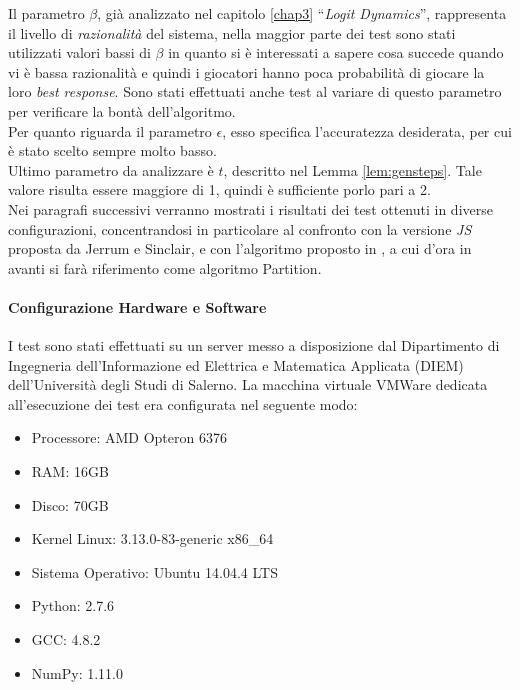 Il parametro $\beta$, già analizzato nel capitolo \ref{chap3} ``\textit{Logit Dynamics}'', rappresenta il livello di \textit{razionalità} del sistema, nella maggior parte dei test sono stati utilizzati valori bassi di $\beta$ in quanto si è interessati a sapere cosa succede quando vi è bassa razionalità e quindi i giocatori hanno poca probabilità di giocare la loro \textit{best response}. Sono stati effettuati anche test al variare di questo parametro per verificare la bontà dell'algoritmo.\\
Per quanto riguarda il parametro $\epsilon$, esso specifica l'accuratezza desiderata, per cui è stato scelto sempre molto basso.\\
Ultimo parametro da analizzare è $t$, descritto nel Lemma \ref{lem:gensteps}. Tale valore risulta essere maggiore di 1, quindi è sufficiente porlo pari a 2.\\
Nei paragrafi successivi verranno mostrati i risultati dei test ottenuti in diverse configurazioni, concentrandosi in particolare al confronto con la versione \textit{JS} proposta da Jerrum e Sinclair, e con l'algoritmo proposto in \cite{rinaldi2016approximation}, a cui d'ora in avanti si farà riferimento come algoritmo Partition.\\
\paragraph{Configurazione Hardware e Software}
I test sono stati effettuati su un server messo a disposizione dal Dipartimento di Ingegneria dell'Informazione ed Elettrica e Matematica Applicata (DIEM) dell'Università degli Studi di Salerno. La macchina virtuale VMWare dedicata all'esecuzione dei test era configurata nel seguente modo:
\begin{itemize}
	\item Processore: AMD Opteron 6376
	\item RAM: 16GB
	\item Disco: 70GB
	\item Kernel Linux: 3.13.0-83-generic x86\_64
	\item Sistema Operativo: Ubuntu 14.04.4 LTS
	\item Python: 2.7.6
	\item GCC: 4.8.2
	\item NumPy: 1.11.0
\end{itemize}
